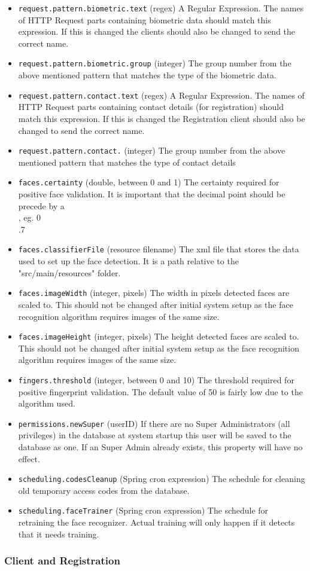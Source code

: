 \begin{itemize}
\item \verb!request.pattern.biometric.text! (regex) A Regular Expression. The names of HTTP Request parts containing biometric data should match this expression. If this is changed the clients should also be changed to send the correct name.
\item \verb!request.pattern.biometric.group! (integer) The group number from the above mentioned pattern that matches the type of the biometric data.
\item \verb!request.pattern.contact.text! (regex) A Regular Expression. The names of HTTP Request parts containing contact details (for registration) should match this expression. If this is changed the Registration client should also be changed to send the correct name.
\item \verb!request.pattern.contact.! (integer) The group number from the above mentioned pattern that matches the type of contact details

\item \verb!faces.certainty! (double, between 0 and 1) The certainty required for positive face validation. It is important that the decimal point should be precede by a \\, eg. 0\\.7 
\item \verb!faces.classifierFile! (resource filename) The xml file that stores the data used to set up the face detection. It is a path relative to the "src/main/resources" folder. 
\item \verb!faces.imageWidth! (integer, pixels) The width in pixels detected faces are scaled to. This should not be changed after initial system setup as the face recognition algorithm requires images of the same size.
\item \verb!faces.imageHeight! (integer, pixels) The height detected faces are scaled to. This should not be changed after initial system setup as the face recognition algorithm requires images of the same size.

\item \verb!fingers.threshold! (integer, between 0 and 10) The threshold required for positive fingerprint validation. The default value of 50 is fairly low due to the algorithm used.
\item \verb!permissions.newSuper! (userID) If there are no Super Administrators (all privileges) in the database at system startup this user will be saved to the database as one. If an Super Admin already exists, this property will have no effect. 

\item \verb!scheduling.codesCleanup! (Spring cron expression) The schedule for cleaning old temporary access codes from the database.
\item \verb!scheduling.faceTrainer! (Spring cron expression) The schedule for retraining the face recognizer. Actual training will only happen if it detects that it needs training. 
\end{itemize}
\subsubsection{Client and Registration}